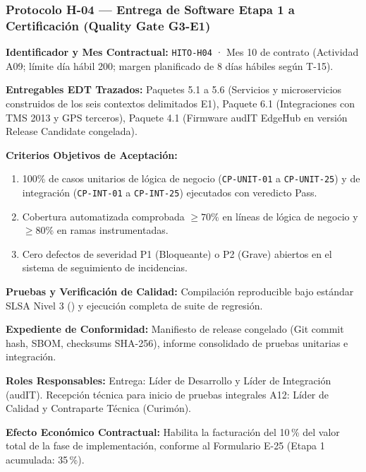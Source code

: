 \subsubsection*{Protocolo H-04 — Entrega de Software Etapa 1 a Certificación (Quality Gate G3-E1)}\label{sec:9-proto-h4}
\par\noindent\textbf{Identificador y Mes Contractual:} \texttt{HITO-H04} · Mes 10 de contrato (Actividad A09; límite día hábil 200; margen planificado de 8 días hábiles según T-15).\par
\par\noindent\textbf{Entregables EDT Trazados:} Paquetes 5.1 a 5.6 (Servicios y microservicios construidos de los seis contextos delimitados E1), Paquete 6.1 (Integraciones con TMS 2013 y GPS terceros), Paquete 4.1 (Firmware audIT EdgeHub en versión Release Candidate congelada).\par
\par\noindent\textbf{Criterios Objetivos de Aceptación:}
\begin{enumerate}
  \item 100\% de casos unitarios de lógica de negocio (\texttt{CP-UNIT-01} a \texttt{CP-UNIT-25}) y de integración (\texttt{CP-INT-01} a \texttt{CP-INT-25}) ejecutados con veredicto Pass.
  \item Cobertura automatizada comprobada $\ge 70\%$ en líneas de lógica de negocio y $\ge 80\%$ en ramas instrumentadas.
  \item Cero defectos de severidad P1 (Bloqueante) o P2 (Grave) abiertos en el sistema de seguimiento de incidencias.
\end{enumerate}
\par\noindent\textbf{Pruebas y Verificación de Calidad:} Compilación reproducible bajo estándar SLSA Nivel 3 () y ejecución completa de suite de regresión.\par
\par\noindent\textbf{Expediente de Conformidad:} Manifiesto de release congelado (Git commit hash, SBOM, checksums SHA-256), informe consolidado de pruebas unitarias e integración.\par
\par\noindent\textbf{Roles Responsables:} Entrega: Líder de Desarrollo y Líder de Integración (audIT). Recepción técnica para inicio de pruebas integrales A12: Líder de Calidad y Contraparte Técnica (Curimón).\par
\par\noindent\textbf{Efecto Económico Contractual:} Habilita la facturación del 10\,\% del valor total de la fase de implementación, conforme al Formulario E-25 (Etapa 1 acumulada: 35\,\%).\par

